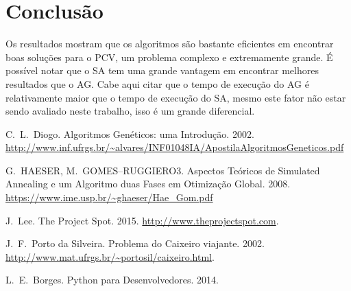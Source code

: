 \documentclass[journal, a4paper]{IEEEtran}
\begin{document}
\section{Conclusão}
	Os resultados mostram que os algoritmos são bastante eficientes em encontrar boas soluções para o PCV, um problema complexo e extremamente grande. É possível notar que o SA tem uma grande vantagem em encontrar melhores resultados que o AG. Cabe aqui citar que o tempo de execução do AG é relativamente maior que o tempo de execução do SA, mesmo este fator não estar sendo avaliado neste trabalho, isso é um grande diferencial.

\begin{thebibliography}{5}
	C.~L.~Diogo. Algoritmos Genéticos: uma Introdução. 2002.
    \url{http://www.inf.ufrgs.br/~alvares/INF01048IA/ApostilaAlgoritmosGeneticos.pdf}

	G.~HAESER, M.~GOMES–RUGGIERO3. Aspectos Teóricos de Simulated Annealing e um Algoritmo duas Fases em Otimização Global. 2008.
	\url{https://www.ime.usp.br/~ghaeser/Hae_Gom.pdf}

    J.~Lee. The Project Spot. 2015. \url{http://www.theprojectspot.com}.

	J.~F.~Porto da Silveira. Problema do Caixeiro viajante. 2002.
    \url{http://www.mat.ufrgs.br/~portosil/caixeiro.html}.

    L.~E.~Borges. Python para Desenvolvedores. 2014.
\end{thebibliography}
\end{document}

